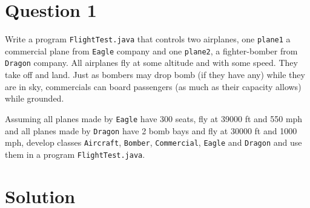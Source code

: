 \documentclass[12pt,letterpaper,twoside]{article}
\begin{document}


\section*{Question 1}

Write a program \texttt{FlightTest.java} that controls two airplanes, one \texttt{plane1} a commercial plane from \texttt{Eagle} company and one \texttt{plane2}, a fighter-bomber from \texttt{Dragon} company.  All airplanes fly at some altitude and with some speed. They take off and land. Just as bombers may drop bomb (if they have any) while they are in sky, commercials can board passengers (as much as their capacity allows) while grounded.

Assuming all planes made by \texttt{Eagle} have 300 seats, fly at 39000 ft and 550 mph and all planes made by \texttt{Dragon} have 2 bomb bays and fly at 30000 ft and 1000 mph, develop classes \texttt{Aircraft}, \texttt{Bomber}, \texttt{Commercial}, \texttt{Eagle} and \texttt{Dragon} and use them in a program \texttt{FlightTest.java}.

\section*{Solution}
\end{document}
